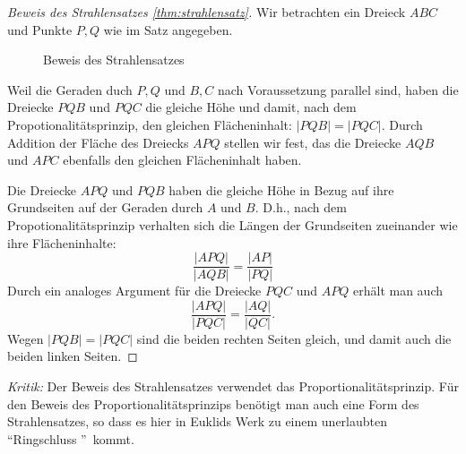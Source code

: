 \begin{proof}[Beweis des Strahlensatzes \ref{thm:strahlensatz}]
    Wir betrachten ein Dreieck $ABC$ und Punkte $P,Q$ wie im Satz angegeben. %

    \begin{figure}[h]
        
        \caption{Beweis des Strahlensatzes}
    \end{figure}

    Weil die Geraden duch $P,Q$ und $B,C$ nach Voraussetzung parallel sind, haben die Dreiecke $PQB$
    und $PQC$ die gleiche Höhe und damit, nach dem Propotionalitätsprinzip, den gleichen
    Flächeninhalt: $|PQB|=|PQC|$. Durch Addition der Fläche des Dreiecks $APQ$ stellen wir fest, das
    die Dreiecke $AQB$ und $APC$ ebenfalls den gleichen Flächeninhalt haben.

    Die Dreiecke $APQ$ und $PQB$ haben die gleiche Höhe in Bezug auf ihre Grundseiten auf der
    Geraden durch $A$ und $B$. D.h., nach dem Propotionalitätsprinzip verhalten sich die Längen der
    Grundseiten zueinander wie ihre Flächeninhalte:
    $$
    \frac{|APQ|}{|AQB|} = \frac{|AP|}{|PQ|}
    $$
    Durch ein analoges Argument für die Dreiecke $PQC$ und $APQ$ erhält man auch
    $$
    \frac{|APQ|}{|PQC|} = \frac{|AQ|}{|QC|}.
    $$
    Wegen $|PQB|=|PQC|$ sind die beiden rechten Seiten gleich, und damit auch die beiden linken
    Seiten.
\end{proof}

{\em Kritik:} Der Beweis des Strahlensatzes verwendet das Proportionalitätsprinzip. Für den Beweis
des Proportionalitätsprinzips benötigt man auch eine Form des Strahlensatzes, so dass es hier in
Euklids Werk zu einem unerlaubten "`Ringschluss "'\ kommt.


